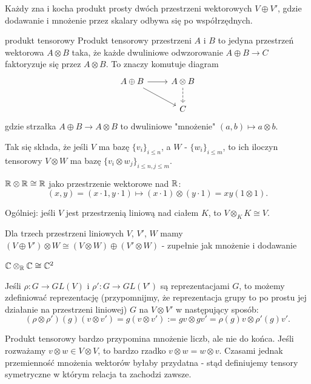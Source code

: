 Każdy zna i kocha produkt prosty dwóch przestrzeni wektorowych $V\oplus V'$, gdzie dodawanie i mnożenie przez skalary odbywa się po współrzędnych. 

\begin{definition}{produkt tensorowy}{}
  Produkt tensorowy przestrzeni $A$ i $B$ to jedyna przestrzeń wektorowa $A\otimes B$ taka, że każde dwuliniowe odwzorowanie $A\oplus B\to C$ faktoryzuje się przez $A\otimes B$. To znaczy komutuje diagram
  $$\begin{tikzcd}
    A\oplus B\arrow[r]\arrow[dr] & A\otimes B \arrow[d, dashed]\\ 
                                 & C
  \end{tikzcd}$$
  gdzie strzałka $A\oplus B\to A\otimes B$ to dwuliniowe "mnożenie" $(a,b)\mapsto a\otimes b$.
\end{definition}

Tak się składa, że jeśli $V$ ma bazę $\{v_i\}_{i\leq n}$, a $W$ - $\{w_i\}_{i\leq m}$, to ich iloczyn tensorowy $V\otimes W$ ma bazę $\{v_i\otimes w_j\}_{i\leq n, j\leq m}$.

\begin{example}[m]
  \item $\mathbb{R}\otimes \mathbb{R}\cong \mathbb{R}$ jako przestrzenie wektorowe nad $\mathbb{R}$: 
    $$(x,y)=(x\cdot 1, y\cdot 1)\mapsto (x\cdot 1)\otimes (y\cdot 1)=xy(1\otimes 1).$$
  \item Ogólniej: jeśli $V$ jest przestrzenią liniową nad ciałem $K$, to $V\otimes_KK\cong V$.
  \item Dla trzech przestrzeni liniowych $V$, $V'$, $W$ mamy $(V\oplus V')\otimes W\cong (V\otimes W)\oplus (V'\otimes W)$ - zupełnie jak mnożenie i dodawanie
  \item $\mathbb{C}\otimes_{\mathbb{R}}\mathbb{C}\cong \mathbb{C}^2$
\end{example}

Jeśli $\rho:G\to GL(V)$ i $\rho':G\to GL(V')$ są reprezentacjami $G$, to możemy zdefiniować reprezentację (przypomnijmy, że reprezentacja grupy to po prostu jej działanie na przestrzeni liniowej) $G$ na $V\otimes V'$ w następujący sposób:
$$(\rho\otimes \rho')(g)(v\otimes v')=g(v\otimes v'):=gv\otimes gv'=\rho(g)v\otimes \rho'(g)v'.$$

Produkt tensorowy bardzo przypomina mnożenie liczb, ale nie do końca. Jeśli rozważamy $v\otimes w\in V\otimes V$, to bardzo rzadko $v\otimes w=w\otimes v$. Czasami jednak przemienność mnożenia wektorów byłaby przydatna - stąd definiujemy tensory symetryczne w którym relacja ta zachodzi zawsze.

